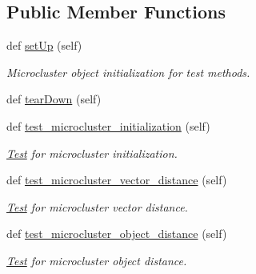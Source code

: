 \subsection*{Public Member Functions}
\begin{DoxyCompactItemize}
\item 
def \hyperlink{classStreamClusteringAlgorithms_1_1evoStream_1_1v1_1_1Tests_1_1MicroClusterV1Test_1_1Test_a3061a186eb72fa52eff8851954b2639b}{set\+Up} (self)
\begin{DoxyCompactList}\small\item\em Microcluster object initialization for test methods. \end{DoxyCompactList}\item 
def \hyperlink{classStreamClusteringAlgorithms_1_1evoStream_1_1v1_1_1Tests_1_1MicroClusterV1Test_1_1Test_af251f92c9394f8b8c06b834871653653}{tear\+Down} (self)
\item 
def \hyperlink{classStreamClusteringAlgorithms_1_1evoStream_1_1v1_1_1Tests_1_1MicroClusterV1Test_1_1Test_ac39ed972c17ae27514d264fbe2a73b73}{test\+\_\+microcluster\+\_\+initialization} (self)
\begin{DoxyCompactList}\small\item\em \hyperlink{classStreamClusteringAlgorithms_1_1evoStream_1_1v1_1_1Tests_1_1MicroClusterV1Test_1_1Test}{Test} for microcluster initialization. \end{DoxyCompactList}\item 
def \hyperlink{classStreamClusteringAlgorithms_1_1evoStream_1_1v1_1_1Tests_1_1MicroClusterV1Test_1_1Test_a2adb5543257fd5ad77b753dd8710edaf}{test\+\_\+microcluster\+\_\+vector\+\_\+distance} (self)
\begin{DoxyCompactList}\small\item\em \hyperlink{classStreamClusteringAlgorithms_1_1evoStream_1_1v1_1_1Tests_1_1MicroClusterV1Test_1_1Test}{Test} for microcluster vector distance. \end{DoxyCompactList}\item 
def \hyperlink{classStreamClusteringAlgorithms_1_1evoStream_1_1v1_1_1Tests_1_1MicroClusterV1Test_1_1Test_a3faffdf61680aa04887298598929d6e4}{test\+\_\+microcluster\+\_\+object\+\_\+distance} (self)
\begin{DoxyCompactList}\small\item\em \hyperlink{classStreamClusteringAlgorithms_1_1evoStream_1_1v1_1_1Tests_1_1MicroClusterV1Test_1_1Test}{Test} for microcluster object distance. \end{DoxyCompactList}\item 

\end{DoxyCompactItemize}
